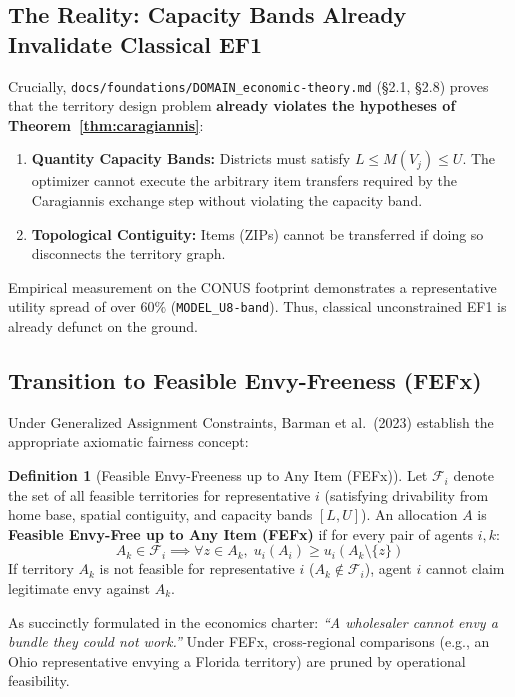\documentclass[11pt,a4paper]{article}
\theoremstyle{plain}
\theoremstyle{definition}
\newtheorem{definition}{Definition}
\begin{document}
\subsection{The Reality: Capacity Bands Already Invalidate Classical EF1}
Crucially, \texttt{docs/foundations/DOMAIN\_economic-theory.md} (§2.1, §2.8) proves that the territory design problem \textbf{already violates the hypotheses of Theorem~\ref{thm:caragiannis}}:
\begin{enumerate}[leftmargin=1.5em]
    \item \textbf{Quantity Capacity Bands:} Districts must satisfy $L \le M(V_j) \le U$. The optimizer cannot execute the arbitrary item transfers required by the Caragiannis exchange step without violating the capacity band.
    \item \textbf{Topological Contiguity:} Items (ZIPs) cannot be transferred if doing so disconnects the territory graph.
\end{enumerate}
Empirical measurement on the CONUS footprint demonstrates a representative utility spread of over $60\%$ (\texttt{MODEL\_U8-band}). Thus, classical unconstrained EF1 is already defunct on the ground.

\subsection{Transition to Feasible Envy-Freeness (FEFx)}
Under Generalized Assignment Constraints, Barman et al.~(2023) establish the appropriate axiomatic fairness concept:
\begin{definition}[Feasible Envy-Freeness up to Any Item (FEFx)]\label{def:fefx}
Let $\mathcal{F}_i$ denote the set of all feasible territories for representative $i$ (satisfying drivability from home base, spatial contiguity, and capacity bands $[L, U]$). An allocation $A$ is \textbf{Feasible Envy-Free up to Any Item (FEFx)} if for every pair of agents $i, k$:
\begin{equation}
    A_k \in \mathcal{F}_i \implies \forall z \in A_k, \; u_i(A_i) \ge u_i(A_k \setminus \{z\})
\end{equation}
If territory $A_k$ is not feasible for representative $i$ ($A_k \notin \mathcal{F}_i$), agent $i$ cannot claim legitimate envy against $A_k$.
\end{definition}
As succinctly formulated in the economics charter: \emph{``A wholesaler cannot envy a bundle they could not work.''} Under FEFx, cross-regional comparisons (e.g., an Ohio representative envying a Florida territory) are pruned by operational feasibility.
\end{document}
